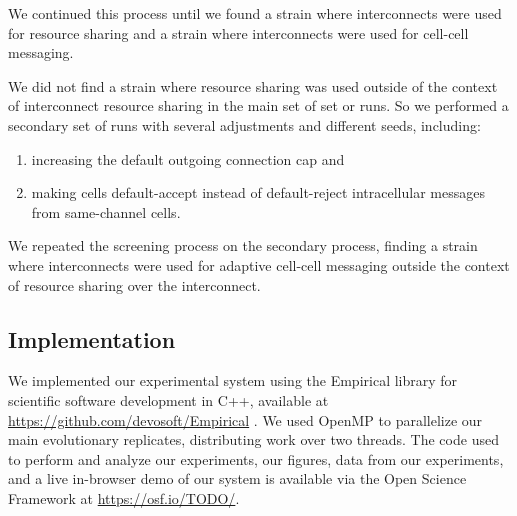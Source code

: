 We continued this process until we found a strain where interconnects were used for resource sharing and a strain where interconnects were used for cell-cell messaging.

We did not find a strain where resource sharing was used outside of the context of interconnect resource sharing in the main set of set or runs.
So we performed a secondary set of runs with several adjustments and different seeds, including:
\begin{enumerate}
  \item increasing the default outgoing connection cap and
  \item making cells default-accept instead of default-reject intracellular messages from same-channel cells.
\end{enumerate}

We repeated the screening process on the secondary process, finding a strain where interconnects were used for adaptive cell-cell messaging outside the context of resource sharing over the interconnect.

\subsection{Implementation}

We implemented our experimental system using the Empirical library for scientific software development in C++, available at \url{https://github.com/devosoft/Empirical} \citep{TODOcite}.
We used OpenMP to parallelize our main evolutionary replicates, distributing work over two threads.
The code used to perform and analyze our experiments, our figures, data from our experiments, and a live in-browser demo of our system is available via the Open Science Framework at \url{https://osf.io/TODO/}.
